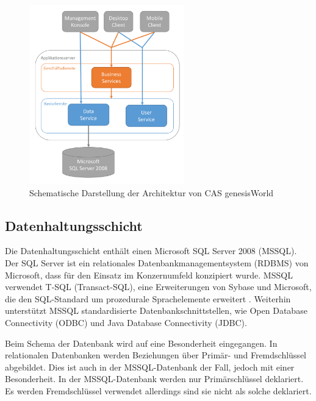 \begin{figure}[H]
	\centering
  \includegraphics[width=0.6\textwidth, width=0.6\textwidth]{pics/GenesisWorld_Architektur.pdf}
	\caption{Schematische Darstellung der Architektur von CAS genesisWorld}
	\label{gw_Architektur}
\end{figure}

\subsection{Datenhaltungsschicht}
\label{ch:Systemanalyse:sec:genesisWorld:subsec:db}

Die Datenhaltungsschicht enthält einen Microsoft SQL Server 2008 (MSSQL). Der SQL Server ist ein relationales Datenbankmanagementsystem (RDBMS) von Microsoft, dass für den Einsatz im Konzernumfeld konzipiert wurde. MSSQL verwendet T-SQL (Transact-SQL), eine Erweiterungen von Sybase und Microsoft, die den SQL-Standard um prozedurale Sprachelemente erweitert \cite{tech2013}. Weiterhin unterstützt MSSQL standardisierte Datenbankschnittstellen, wie Open Database Connectivity (ODBC) und Java Database Connectivity (JDBC).

Beim Schema der Datenbank wird auf eine Besonderheit eingegangen. In relationalen Datenbanken werden Beziehungen über Primär- und Fremdschlüssel abgebildet. Dies ist auch in der MSSQL-Datenbank der Fall, jedoch mit einer Besonderheit. In der MSSQL-Datenbank werden nur Primärschlüssel deklariert. Es werden Fremdschlüssel verwendet allerdings sind sie nicht als solche deklariert.

